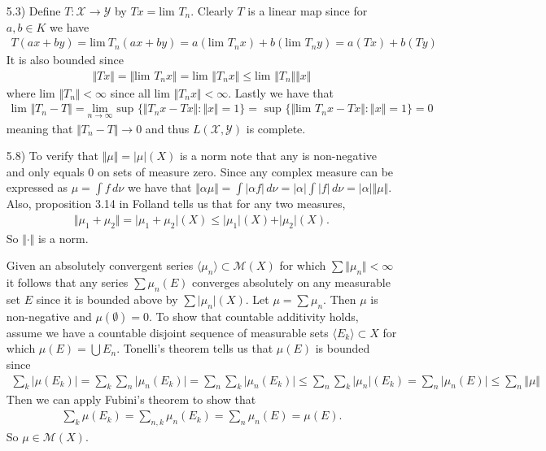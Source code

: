 \documentclass[11pt,letter]{article}
\begin{document}
\begin{enumerate}
    \item[5.3)] Define $T: \mathcal{X} \rightarrow \mathcal{Y}$ by $Tx = \text{lim } T_n$. Clearly $T$ is a linear map since for $a,b \in K$ we have
    \begin{align*}
        T(ax + by) = \text{lim}\ T_n(ax+by) = a(\text{lim } T_nx) + b(\text{lim } T_ny) = a(Tx) + b(Ty)
    \end{align*}
    It is also bounded since
    \begin{align*}
        \Vert Tx \Vert = \Vert \text{lim } T_n x \Vert = \text{lim } \Vert T_n x \Vert \le \text{lim } \Vert T_n \Vert \Vert x \Vert
    \end{align*}
    where $\text{lim } \Vert T_n \Vert < \infty$ since all $\text{lim } \Vert T_n x \Vert < \infty$. Lastly we have that
    \begin{align*}
        \text{lim } \Vert T_n - T \Vert = \underset{n \rightarrow \infty}{\text{lim}} \text{ sup } \{\Vert T_nx - Tx \Vert: \Vert x \Vert = 1\} = \text{ sup } \{\Vert \text{lim } T_nx - Tx \Vert: \Vert x \Vert = 1\} = 0
    \end{align*}
    meaning that $\Vert T_n - T \Vert \rightarrow 0$ and thus $L(\mathcal{X},\mathcal{Y})$ is complete.
    
    \item[5.8)] To verify that $\Vert \mu \Vert = \vert \mu \vert (X)$ is a norm note that any is non-negative and only equals 0 on sets of measure zero. Since any complex measure can be expressed as $\mu = \int f \,d\nu$ we have that $\Vert \alpha \mu \Vert = \int \vert \alpha f \vert \, d\nu = \vert \alpha \vert \int \vert f \vert \,d\nu = \vert \alpha \vert \Vert \mu \Vert$. Also, proposition 3.14 in Folland tells us that for any two measures,
    \begin{align*}
        \Vert \mu_1 + \mu_2 \Vert = \vert \mu_1 + \mu_2 \vert (X) \le \vert \mu_1 \vert (X) + \vert \mu_2 \vert (X).
    \end{align*}
    So $\Vert \cdot \Vert$ is a norm.

    Given an absolutely convergent series $\langle \mu_n \rangle \subset \mathcal{M}(X)$ for which $\sum \Vert \mu_n \Vert < \infty$ it follows that any series $\sum \mu_n(E)$ converges absolutely on any measurable set $E$ since it is bounded above by $\sum \vert \mu_n \vert (X)$. Let $\mu = \sum \mu_n$. Then $\mu$ is non-negative and $\mu(\emptyset) = 0$. To show that countable additivity holds, assume we have a countable disjoint sequence of measurable sets $\langle E_k \rangle \subset X$ for which $\mu(E) = \bigcup E_n$. Tonelli's theorem tells us that $\mu(E)$ is bounded since
    \begin{align*}
        \sum_k \vert \mu(E_k) \vert = \sum_k \sum_n \vert \mu_n(E_k) \vert = \sum_n \sum_k \vert \mu_n(E_k) \vert \le \sum_n \sum_k \vert \mu_n \vert (E_k) = \sum_n \vert \mu_n(E) \vert \le \sum_n \Vert \mu \Vert
    \end{align*}
    Then we can apply Fubini's theorem to show that
    \begin{align*}
        \sum_k \mu(E_k) = \sum_{n,k} \mu_n(E_k) = \sum_n \mu_n(E) = \mu(E).
    \end{align*}
    So $\mu \in \mathcal{M}(X)$.


\end{enumerate}
\end{document}
